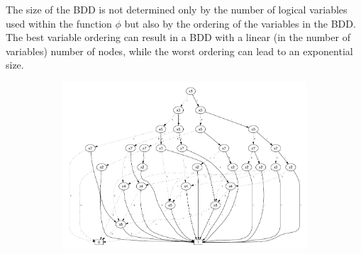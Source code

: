 \documentclass[pdflatex,sn-mathphys-num]{sn-jnl}%
\theoremstyle{thmstyleone}%
\theoremstyle{thmstyletwo}%
\theoremstyle{thmstylethree}%
\begin{document}
        The size of the BDD is not determined only by the number of logical variables used within the function $\phi$ but also by the ordering of the variables in the BDD. The best variable ordering can result in a BDD with a linear (in the number of variables) number of nodes, while the worst ordering can lead to an exponential size.

        \begin{figure}[h]
            \centering
            \begin{subfigure}{0.5\textwidth}
                \includegraphics[width=1.2\textwidth]{Figures/BDD_Variable_Ordering_Bad.pdf}
            \end{subfigure}
            \hspace*{2cm}
            \begin{subfigure}{0.3\textwidth}
                \hspace*{1cm}

\end{subfigure}
\end{figure}
\end{document}
